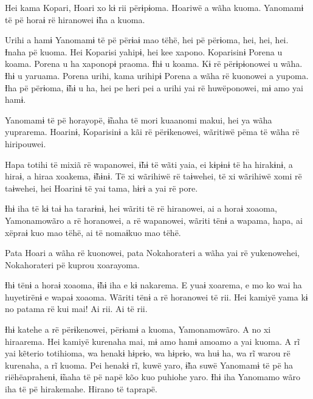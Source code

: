 
Hei kama Kopari, Hoari xo kɨ rii përɨpɨoma. Hoariwë a wãha kuoma.
Yanomamɨ të pë horaɨ rë hiranowei ɨ̃ha a kuoma. 

Urihi a hamɨ Yanomamɨ të pë përɨaɨ mao tëhë, hei pë përɨoma, hei, hei,
hei. Ɨnaha pë kuoma. Hei Koparisi yahipɨ, hei kee xapono. Koparisinɨ
Porena u koama. Porena u ha xaponopɨ praoma. Ɨhɨ u koama. Kɨ rë
përɨpɨonowei u wãha. Ɨhɨ u yaruama. Porena urihi, kama urihipɨ Porena a
wãha rë kuonowei a yupoma. Ɨha pë përɨoma, ɨ̃hɨ u ha, hei pe heri pei a
urihi yai rë huwëponowei, mɨ amo yai hamɨ. 

Yanomamɨ të pë horayopë, ɨ̃naha të mori kuaanomi makui, hei ya wãha
yuprarema. Hoarinɨ, Koparisinɨ a kãi rë përɨkenowei, wãritiwë pëma të
wãha rë hiripouwei. 

Hapa totihi të mixiã rë wapanowei, ɨ̃hɨ të wãti yaia, ei kɨpɨnɨ të ha
hirakɨnɨ, a hiraɨ, a hiraa xoakema, ɨ̃hɨnɨ. Të xi wãrihiwë rë taɨwehei,
të xi wãrihiwë xomi rë taɨwehei, hei Hoarinɨ të yai tama, hɨrɨ a yai rë
pore. 

Ɨhɨ iha të kɨ taɨ ha tararɨnɨ, hei wãriti të rë hiranowei, ai a horaɨ
xoaoma, Yamonamowãro a rë horanowei, a rë wapanowei, wãriti tënɨ a
wapama, hapa, ai xëpraɨ kuo mao tëhë, ai të nomaɨkuo mao tëhë. 

Pata Hoari a wãha rë kuonowei, pata Nokahorateri a wãha yai rë
yukenowehei, Nokahorateri pë kuprou xoarayoma. 

Ɨhɨ tënɨ a horaɨ xoaoma, ɨ̃hɨ iha e kɨ nakarema. E yuaɨ xoarema, e mo ko
wai ha huyetirënɨ e wapaɨ xoaoma. Wãriti tënɨ a rë horanowei të rii. Hei
kamiyë yama kɨ no patama rë kui mai! Ai rii. Ai të rii. 

Ɨhɨ katehe a rë përɨkenowei, përɨamɨ a kuoma, Yamonamowãro. A no xi
hiraarema. Hei kamiyë kurenaha mai, mɨ amo hamɨ amoamo a yai kuoma. A rĩ
yai kẽterio totihioma, wa henakɨ hɨprɨo, wa hɨprɨo, wa huɨ ha, wa rĩ
warou rë kurenaha, a rĩ kuoma. Pei henakɨ rĩ, kuwë yaro, ɨ̃ha suwë
Yanomamɨ të pë ha riëhëaprahenɨ, ɨ̃naha të pë napë kõo kuo puhiohe yaro.
Ɨhɨ iha Yanomamo wãro iha të pë hirakemahe. Hirano të taprapë. 


